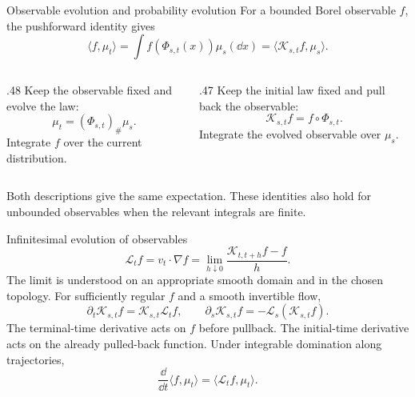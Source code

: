 \begin{frame}[t]{Observable evolution and probability evolution}
\hypertarget{main:duality}{}
For a bounded Borel observable $f$, the pushforward identity gives
\begin{equation*}
  \boxed{\langle f,\mu_t\rangle
  =\int f(\Phi_{s,t}(x))\mu_s(\dd x)
  =\langle\mathcal K_{s,t}f,\mu_s\rangle.}
\end{equation*}
\begin{columns}[T,onlytextwidth]
  \begin{column}{.48\textwidth}
    Keep the observable fixed and evolve the law:
    \begin{equation*}
      \mu_t=(\Phi_{s,t})_\#\mu_s.
    \end{equation*}
    Integrate $f$ over the current distribution.
  \end{column}
  \begin{column}{.47\textwidth}
    Keep the initial law fixed and pull back the observable:
    \begin{equation*}
      \mathcal K_{s,t}f=f\circ\Phi_{s,t}.
    \end{equation*}
    Integrate the evolved observable over $\mu_s$.
  \end{column}
\end{columns}
\medskip
Both descriptions give the same expectation. These identities also hold for
unbounded observables when the relevant integrals are finite.
\end{frame}

\begin{frame}[t]{Infinitesimal evolution of observables}
\hypertarget{main:generator}{}
\begin{equation*}
  \mathcal L_t f=v_t\cdot\nabla f
  =\lim_{h\downarrow0}\frac{\mathcal K_{t,t+h}f-f}{h}.
\end{equation*}
The limit is understood on an appropriate smooth domain and in the chosen topology.
For sufficiently regular $f$ and a smooth invertible flow,
\begin{equation*}
  \partial_t\mathcal K_{s,t}f=\mathcal K_{s,t}\mathcal L_t f,
  \qquad
  \partial_s\mathcal K_{s,t}f=-\mathcal L_s(\mathcal K_{s,t}f).
\end{equation*}
The terminal-time derivative acts on $f$ before pullback. The initial-time
derivative acts on the already pulled-back function.
Under integrable domination along trajectories,
\begin{equation*}
  \frac{\dd}{\dd t}\langle f,\mu_t\rangle=\langle\mathcal L_t f,\mu_t\rangle.
\end{equation*}
\end{frame}

